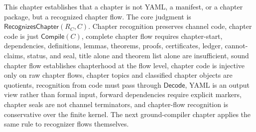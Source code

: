 \begin{remark}[Outlook]
\label{rem:chapter-generated-outlook}
This chapter establishes that a chapter is not YAML, a manifest, or a chapter package, but a recognized chapter flow. The core judgment is $\mathsf{RecognizesChapter}(R_C,C)$. Chapter recognition preserves channel code, chapter code is just $\mathsf{Compile}(C)$, complete chapter flow requires chapter-start, dependencies, definitions, lemmas, theorems, proofs, certificates, ledger, cannot-claims, status, and seal, title alone and theorem list alone are insufficient, sound chapter flow establishes chapterhood at the flow level, chapter code is injective only on raw chapter flows, chapter topics and classified chapter objects are quotients, recognition from code must pass through $\mathsf{Decode}$, YAML is an output view rather than formal input, forward dependencies require explicit markers, chapter seals are not channel terminators, and chapter-flow recognition is conservative over the finite kernel. The next ground-compiler chapter applies the same rule to recognizer flows themselves.
\end{remark}
